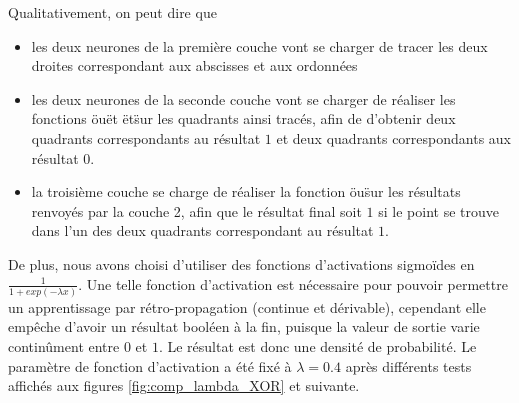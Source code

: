 Qualitativement, on peut dire que 
\begin{itemize}
  \item les deux neurones de la première couche vont se charger de tracer les deux droites correspondant aux abscisses et aux ordonnées
  \item les deux neurones de la seconde couche vont se charger de réaliser les fonctions \"ou\" et \"et\" sur les quadrants ainsi tracés, afin de d'obtenir deux quadrants correspondants au résultat $1$ et deux quadrants correspondants aux résultat $0$.
  \item la troisième couche se charge de réaliser la fonction \"ou\" sur les résultats renvoyés par la couche 2, afin que le résultat final soit $1$ si le point se trouve dans l'un des deux quadrants correspondant au résultat $1$.
\end{itemize}

De plus, nous avons choisi d'utiliser des fonctions d'activations sigmoïdes en $\frac{1}{1+exp(-\lambda x)}$. Une telle fonction d'activation est nécessaire pour pouvoir permettre un apprentissage par rétro-propagation (continue et dérivable), cependant elle empêche d'avoir un résultat booléen à la fin, puisque la valeur de sortie varie continûment entre $0$ et $1$. Le résultat est donc une densité de probabilité. Le paramètre de fonction d'activation a été fixé à $\lambda = 0.4$ après différents tests affichés aux figures \ref{fig:comp_lambda_XOR} et suivante.

